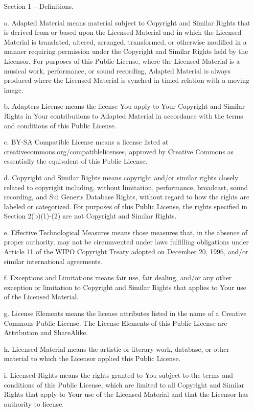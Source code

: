Section 1 -- Definitions.

a. Adapted Material means material subject to Copyright and Similar Rights that is derived from or based upon the Licensed Material and in which the Licensed Material is translated, altered, arranged, transformed, or otherwise modified in a manner requiring permission under the Copyright and Similar Rights held by the Licensor. For purposes of this Public License, where the Licensed Material is a musical work, performance, or sound recording, Adapted Material is always produced where the Licensed Material is synched in timed relation with a moving image.

b. Adapter\textquotesingle{}s License means the license You apply to Your Copyright and Similar Rights in Your contributions to Adapted Material in accordance with the terms and conditions of this Public License.

c. BY-\/\+SA Compatible License means a license listed at creativecommons.\+org/compatiblelicenses, approved by Creative Commons as essentially the equivalent of this Public License.

d. Copyright and Similar Rights means copyright and/or similar rights closely related to copyright including, without limitation, performance, broadcast, sound recording, and Sui Generis Database Rights, without regard to how the rights are labeled or categorized. For purposes of this Public License, the rights specified in Section 2(b)(1)-\/(2) are not Copyright and Similar Rights.

e. Effective Technological Measures means those measures that, in the absence of proper authority, may not be circumvented under laws fulfilling obligations under Article 11 of the WIPO Copyright Treaty adopted on December 20, 1996, and/or similar international agreements.

f. Exceptions and Limitations means fair use, fair dealing, and/or any other exception or limitation to Copyright and Similar Rights that applies to Your use of the Licensed Material.

g. License Elements means the license attributes listed in the name of a Creative Commons Public License. The License Elements of this Public License are Attribution and Share\+Alike.

h. Licensed Material means the artistic or literary work, database, or other material to which the Licensor applied this Public License.

i. Licensed Rights means the rights granted to You subject to the terms and conditions of this Public License, which are limited to all Copyright and Similar Rights that apply to Your use of the Licensed Material and that the Licensor has authority to license.


